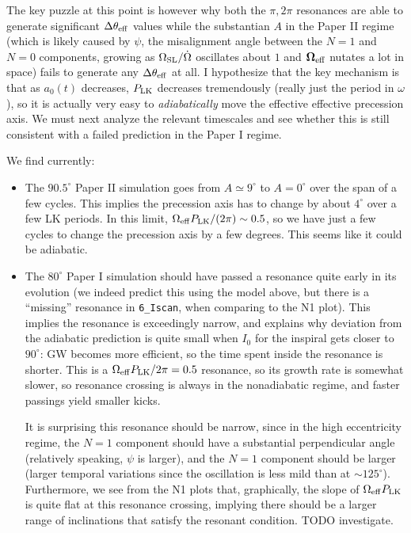 \documentclass[11pt,
        usenames, %
        dvipsnames %
    ]{article}
\newcommand*{\bm}[1]{\boldsymbol{\mathbf{#1}}}
\begin{document}
The key puzzle at this point is however why both the $\pi, 2\pi$ resonances are
able to generate significant $\Delta \theta_{\rm eff}$ values while the
substantian $A$ in the Paper II regime (which is likely caused by $\psi$, the
misalignment angle between the $N = 1$ and $N = 0$ components, growing as
$\Omega_{\rm SL} / \dot{\Omega}$ oscillates about $1$ and $\bm{\Omega}_{\rm
eff}$ nutates a lot in space) fails to generate any $\Delta \theta_{\rm eff}$ at
all. I hypothesize that the key mechanism is that as $a_0(t)$ decreases, $P_{\rm
LK}$ decreases tremendously (really just the period in $\omega$), so it is
actually very easy to \emph{adiabatically} move the effective effective
precession axis. We must next analyze the relevant timescales and see whether
this is still consistent with a failed prediction in the Paper I regime.

We find currently:
\begin{itemize}
    \item The $90.5^\circ$ Paper II simulation goes from $A \simeq 9^\circ$ to
        $A = 0^\circ$ over the span of a few cycles. This implies the precession
        axis has to change by about $4^\circ$ over a few LK periods. In this
        limit, $\Omega_{\rm eff} P_{\rm LK} / (2\pi) \sim 0.5$, so we have just
        a few cycles to change the precession axis by a few degrees. This seems
        like it could be adiabatic.

    \item The $80^\circ$ Paper I simulation should have passed a resonance quite
        early in its evolution (we indeed predict this using the model above,
        but there is a ``missing'' resonance in \lstinline{6_Iscan}, when
        comparing to the N1 plot). This implies the resonance is exceedingly
        narrow, and explains why deviation from the adiabatic prediction is
        quite small when $I_0$ for the inspiral gets closer to $90^\circ$: GW
        becomes more efficient, so the time spent inside the resonance is
        shorter. This is a $\Omega_{\rm eff}P_{\rm LK}/2\pi = 0.5$ resonance, so
        its growth rate is somewhat slower, so resonance crossing is always in
        the nonadiabatic regime, and faster passings yield smaller kicks.

        It is surprising this resonance should be narrow, since in the high
        eccentricity regime, the $N = 1$ component should have a substantial
        perpendicular angle (relatively speaking, $\psi$ is larger), and the $N
        = 1$ component should be larger (larger temporal variations since the
        oscillation is less mild than at $\sim 125^\circ$). Furthermore, we see
        from the N1 plots that, graphically, the slope of $\Omega_{\rm eff}
        P_{\rm LK}$ is quite flat at this resonance crossing, implying there
        should be a larger range of inclinations that satisfy the resonant
        condition. TODO investigate.
\end{itemize}
\end{document}
